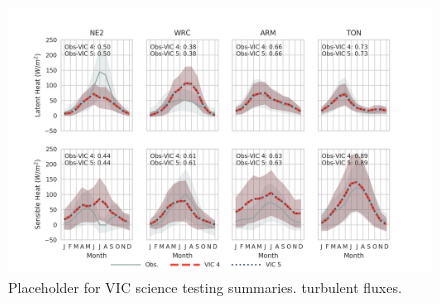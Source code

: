 \documentclass[gmd, manuscript]{copernicus}
\begin{document}
\clearpage
\begin{figure}[t]
\includegraphics[width=12cm]{VIC_science_tests_fluxes.png}
\caption{Placeholder for VIC science testing summaries. turbulent fluxes.}
\label{fig:vic_fluxes}
\end{figure}
\end{document}
